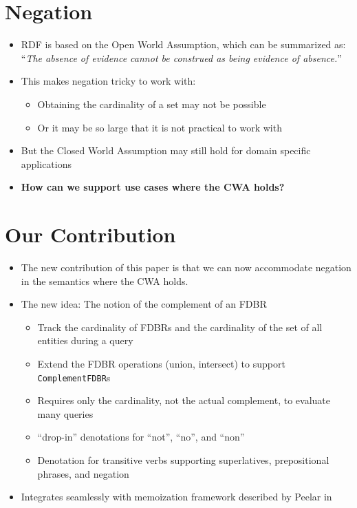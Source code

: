 \documentclass[logoontitle,tabu,supertabular,aspectratio=43]{preney-uwindsor-beamer}
\begin{document}
    \section{Negation}
    \begin{frame}{\insertsection}
        \begin{itemize}
            \item RDF is based on the Open World Assumption, which can be summarized as: \linebreak
            ``\textit{The absence of evidence cannot be construed as being evidence of absence.}''
            \item This makes negation tricky to work with:
            \begin{itemize}
                \item Obtaining the cardinality of a set may not be possible
                \item Or it may be so large that it is not practical to work with
            \end{itemize}
            \item But the Closed World Assumption may still hold for domain specific applications
            \item \textbf{How can we support use cases where the CWA holds?}
        \end{itemize}
    \end{frame}

	\section{Our Contribution}
    \begin{frame}{\insertsection}
        \begin{itemize}
            \item The new contribution of this paper is that we can now accommodate negation in the semantics where the CWA holds.
            \item The new idea: The notion of the complement of an FDBR
            \begin{itemize}
                \item Track the cardinality of FDBRs and the cardinality of the set of all entities during a query
                \item Extend the FDBR operations (union, intersect) to support \texttt{ComplementFDBR}s
                \item Requires only the cardinality, not the actual complement, to evaluate many queries
                \item ``drop-in'' denotations for ``not'', ``no'', and ``non''
                \item Denotation for transitive verbs supporting superlatives, prepositional phrases, and negation
            \end{itemize}
            \item Integrates seamlessly with memoization framework described by Peelar in \cite{peelar2020webistjournal}
        \end{itemize}
    \end{frame}
\end{document}
